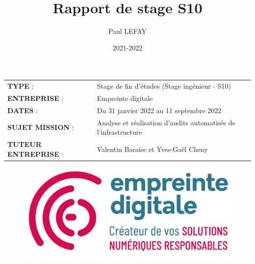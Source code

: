 \documentclass[12pt]{article}
\title{Rapport de stage S10}
\author{Paul LEFAY}
\date{2021-2022}
\begin{document}
\cfoot{\thepage}

\renewcommand{\headrulewidth}{0.4pt}
\renewcommand{\footrulewidth}{0.4pt}
\renewcommand{\contentsname}{Table des matières}
\renewcommand{\listfigurename}{}
\renewcommand{\listtablename}{}
\renewcommand{\thebibliography}{}
\renewcommand{\glossarysection}[2][]{}

\maketitle
\thispagestyle{empty}
\begin{center}
	\begin{tabular}{ m{5cm} m{11.5cm} }
	\textbf{TYPE} : & \mbox{\ooalign{$\checkmark$\cr\hidewidth$\square$\hidewidth\cr}}  Stage de fin d'études (Stage ingénieur - S10) \\
   \textbf{ENTREPRISE} :  & Empreinte digitale \\
   \textbf{DATES} : & Du 31 janvier 2022 au 11 septembre 2022 \\
   \textbf{SUJET MISSION} : & Analyse et réalisation d'audits automatisés de l'infrastructure \\
   \textbf{TUTEUR ENTREPRISE} :  & Valentin Baraise et Yves-Gaël Cheny \\
 \end{tabular}
\end{center}

\begin{figure}[!ht]
    \centering
    \includegraphics[scale=0.8]{src/logo_ed.png}
    \label{fig:ed_logo}
\end{figure}
\end{document}
